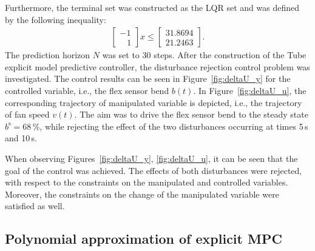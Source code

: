\documentclass[letterpaper, 10 pt, conference]{ieeeconf}
\begin{document}
	Furthermore, the terminal set was constructed as the LQR set and was defined by the following inequality:
	\begin{eqnarray}
		\label{eq:setup_terminal_set}
		\begin{bmatrix}
			-1 \\	
			\,\,\,\,\, 1
		\end{bmatrix} x \le 
		\begin{bmatrix}
			31.8694\\	
			21.2463
		\end{bmatrix}.
	\end{eqnarray}
	The prediction horizon $N$ was set to 30 steps. 
	After the construction of the Tube explicit model predictive controller, the disturbance rejection control problem was investigated. The control results can be seen in Figure~\ref{fig:deltaU_y} for the controlled variable, i.e., the flex sensor bend $b(t)$. In Figure~\ref{fig:deltaU_u}, the corresponding trajectory of manipulated variable is depicted, i.e., the trajectory of fan speed $v(t)$. The aim was to drive the flex sensor bend to the steady state $ b^\mathrm{s} = 68\,\%$, while rejecting the effect of the two disturbances occurring at times 5\,s and 10\,s. 
	
	When observing Figures~\ref{fig:deltaU_y}, \ref{fig:deltaU_u}, it can be seen that the goal of the control was achieved. The effects of both disturbances were rejected, with respect to the constraints on the manipulated and controlled variables. Moreover, the constraints on the change of the manipulated variable were satisfied as well.
	
	\subsection{Polynomial approximation of explicit MPC}
	\label{sec:polynomial_exp}
	
\end{document}
